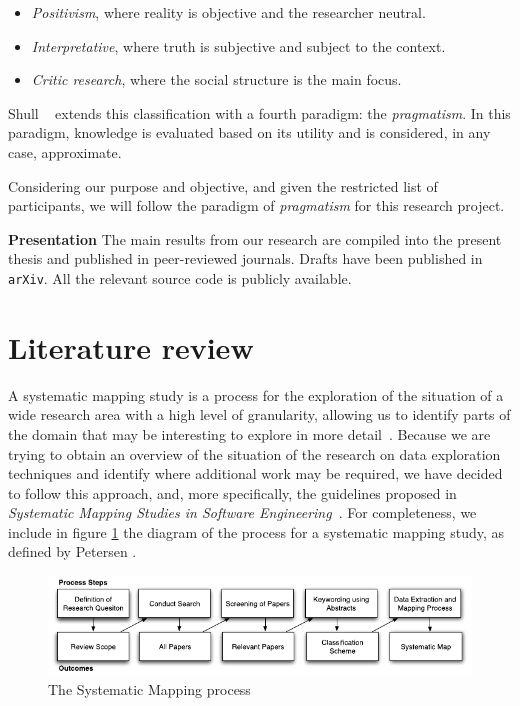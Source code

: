 \begin{itemize}
    \item \emph{Positivism}, where reality is objective and the researcher neutral.
    \item \emph{Interpretative}, where truth is subjective and subject to the context.
    \item \emph{Critic research}, where the social structure is the main focus.
\end{itemize}

Shull \etal~\cite{Shull2008} extends this classification with a fourth paradigm:
the \emph{pragmatism}. In this paradigm, knowledge is evaluated based on its
utility and is considered, in any case, approximate.

Considering our purpose and objective, and given the restricted list of
participants, we will follow the paradigm of \emph{pragmatism} for this research project.

\textbf{Presentation}
\label{method:presentation}
The main results from our research are compiled into the present thesis
and published in peer-reviewed journals. Drafts have been published in \texttt{arXiv}.
All the relevant source code is publicly available.

\section{Literature review}
\label{sec:method_literature_review}
A systematic mapping study is a process for the exploration of
the situation of a wide research area with a high level of granularity,
allowing us to identify parts of the domain that may be interesting to
explore in more detail~\cite{Kitchenham2007}. Because we are trying to obtain
an overview of the situation of the research on data exploration techniques
and identify where additional work may be required, we have decided to follow this
approach, and, more specifically, the guidelines proposed in
\emph{Systematic Mapping Studies in Software Engineering}~\cite{Petersen2007}.
For completeness, we include in figure \ref{fig:systematicmapping_diagram} the
diagram of the process for a systematic mapping study, as defined by
Petersen \etal.

\begin{figure}[htbp]
    \centering
    \includegraphics{images/3_mapping/systematicmapping_diagram}
    \caption{The Systematic Mapping process}
    \label{fig:systematicmapping_diagram}
\end{figure}


